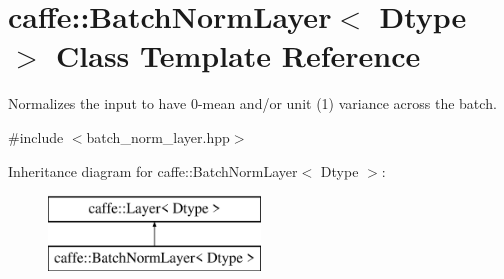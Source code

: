 \hypertarget{classcaffe_1_1BatchNormLayer}{}\section{caffe\+:\+:Batch\+Norm\+Layer$<$ Dtype $>$ Class Template Reference}
\label{classcaffe_1_1BatchNormLayer}


Normalizes the input to have 0-\/mean and/or unit (1) variance across the batch.  




{\ttfamily \#include $<$batch\+\_\+norm\+\_\+layer.\+hpp$>$}

Inheritance diagram for caffe\+:\+:Batch\+Norm\+Layer$<$ Dtype $>$\+:\begin{figure}[H]
\begin{center}
\leavevmode
\includegraphics[height=2.000000cm]{classcaffe_1_1BatchNormLayer}
\end{center}
\end{figure}
